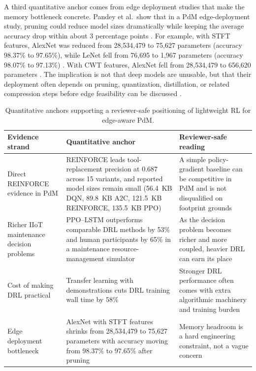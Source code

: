 \documentclass[refree,sn-basic]{sn-jnl} %
\begin{document}
A third quantitative anchor comes from edge deployment studies that make the memory bottleneck concrete. Pandey et al.~show that in a PdM edge-deployment study, pruning could reduce model sizes dramatically while keeping the average accuracy drop within about 3 percentage points \cite{Pandey2023}. For example, with STFT features, AlexNet was reduced from 28,534,479 to 75,627 parameters (accuracy 98.37\% to 97.65\%), while LeNet fell from 76,695 to 1,967 parameters (accuracy 98.07\% to 97.13\%) \cite{Pandey2023}. With CWT features, AlexNet fell from 28,534,479 to 656,620 parameters \cite{Pandey2023}. The implication is not that deep models are unusable, but that their deployment often depends on pruning, quantization, distillation, or related compression steps before edge feasibility can be discussed \cite{Pandey2023, Jang2020, Xu2022}.

\begin{table}[t]
        \centering
        \small
        \setlength{\tabcolsep}{4pt}
        \begin{tabular}{p{} p{} p{}}
                \toprule
                Evidence strand & Quantitative anchor & Reviewer-safe reading \\
                \midrule
                Direct REINFORCE evidence in PdM & REINFORCE leads tool-replacement precision at 0.687 across 15 variants, and reported model sizes remain small (56.4~KB DQN, 89.8~KB A2C, 121.5~KB REINFORCE, 135.5~KB PPO) \cite{Siraskar2025} & A simple policy-gradient baseline can be competitive in PdM and is not disqualified on footprint grounds \\
                Richer IIoT maintenance decision problems & PPO--LSTM outperforms comparable DRL methods by 53\% and human participants by 65\% in a maintenance resource-management simulator \cite{Ong2022-01} & As the decision problem becomes richer and more coupled, heavier DRL can earn its place \\
                Cost of making DRL practical & Transfer learning with demonstrations cuts DRL training wall time by 58\% \cite{Ong2022-02} & Stronger DRL performance often comes with extra algorithmic machinery and training burden \\
                Edge deployment bottleneck & AlexNet with STFT features shrinks from 28,534,479 to 75,627 parameters with accuracy moving from 98.37\% to 97.65\% after pruning \cite{Pandey2023} & Memory headroom is a hard engineering constraint, not a vague concern \\
                \bottomrule
        \end{tabular}
        \caption{Quantitative anchors supporting a reviewer-safe positioning of lightweight RL for edge-aware PdM.}
        \label{tab:quantitative_anchors_lightweight_edge}
\end{table}
\end{document}
